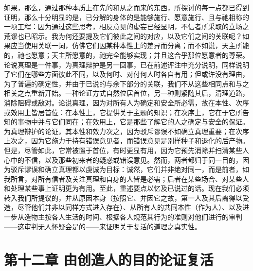 如果，那么，通过那种本质上在先的和从之而来的东西，所探讨的每一点都已得到证明，那么十分明显的是，已分解的身体的是能够施行、愿意施行、且与祂相称的一项工程：因为通过这些思考，相反意见的虚妄已经显明，不信者所采取的立场之荒谬也已昭示。我为何还要提及它们彼此之间的对应，以及它们之间的关联呢？如果应当使用关联一词，仿佛它们因某种本性上的差异而分离；而不如说，天主所能的，祂也愿意；天主所愿意的，祂完全能够实现；并且这合乎那位愿意者的尊荣。论说真理是一件事，为真理辩护是另一回事，已在前述评注中充分说明，同样说明了它们在哪些方面彼此不同，以及何时、对付何人时各自有用；但或许没有理由，为了普遍的确定性，并由于已说的与余下部分的关联，我们不从这些相同点和与之相关之点重新开始。一种论证方式自然位居首位，另一种则紧随其后，清理道路，消除阻碍或敌对。论说真理，因为对所有人为确定和安全所必需，故在本性、次序或效用上皆居首位：在本性上，它提供关于主题的知识；在次序上，它在于它所告知的事物中并与它们同在；在效用上，它是那些了解它的人之确定与安全的保证。为真理辩护的论证，其本性和效力次之，因为驳斥谬误不如确立真理重要；在次序上次之，因为它施力于持有错误意见者，而错误意见是别样种子和退化的后产物。但是，尽管如此，它常被置于首位，有时更显有用，因为它预先消除并扫清某些人心中的不信，以及那些初来者的疑惑或错误意见。然而，两者都归于同一目的，因为驳斥谬误和确立真理都以虔诚为目标：诚然，它们并非绝对同一，而是前者，如我所言，对所有信者及关注真理和自身的人皆是必需；后者在某些场合、对某些人和处理某些事上证明更为有用。至此，重述要点以忆及已说过的话。现在我们必须转入我们所提议的，并从原因本身（按照它、并因它之故，第一人及其后裔得以受造，尽管他们并非以同样方式进入存在）、从所有人的共同本性（作为人）、以及进一步从造物主按各人生活的时间、根据各人规范其行为的准则对他们进行的审判——这审判无人怀疑会是的——来证明关于复活的道理之真实性。\par


\section{第十二章 由创造人的目的论证复活}

